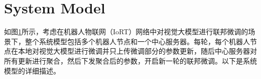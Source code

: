 \documentclass[lettersize,journal]{IEEEtran}
\begin{document}


\section{System Model}

\begin{figure}[htbp]
    \centering
    \label{fig:scenario}
\end{figure}

如图\ref{fig:scenario}所示，考虑在机器人物联网（IoRT）网络中对视觉大模型进行联邦微调的场景下，整个系统模型包括多个机器人节点和一个中心服务器。每轮，每个机器人节点在本地对视觉大模型进行微调并只上传微调部分的参数更新，随后中心服务器对所有更新进行聚合，然后下发聚合后的参数，开启新一轮的联邦微调。以下是系统模型的详细描述。
\end{document}
